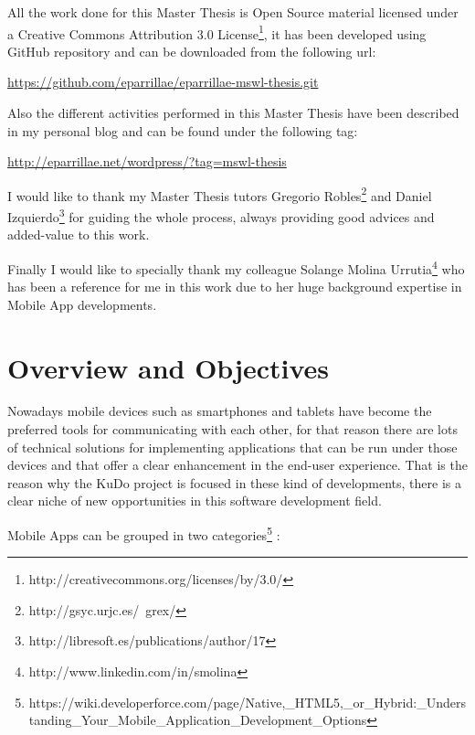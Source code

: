 \documentclass[a4paper,12pt]{book}
\begin{document}
All the work done for this Master Thesis is Open Source material licensed under a Creative Commons Attribution 3.0 License\footnote{http://creativecommons.org/licenses/by/3.0/}, it has been developed using GitHub repository and can be downloaded from the following url:

\url{
https://github.com/eparrillae/eparrillae-mswl-thesis.git}


Also the different activities performed in this Master Thesis have been described in my personal blog and can be found under the following tag:

\url{
http://eparrillae.net/wordpress/?tag=mswl-thesis}


I would like to thank my Master Thesis tutors Gregorio Robles\footnote{http://gsyc.urjc.es/~grex/}  and Daniel Izquierdo\footnote{http://libresoft.es/publications/author/17} for guiding the whole process, always providing good advices and added-value to this work.


Finally I would like to specially thank my colleague Solange Molina Urrutia\footnote{http://www.linkedin.com/in/smolina} who has been a reference for me in this work due to her huge background expertise in Mobile App developments.  


\chapter{Overview and Objectives}
\label{chap:overview}

Nowadays mobile devices such as smartphones and tablets have become the preferred tools for communicating with each other, for that reason there are lots of technical solutions for implementing applications that can be run under those devices and that offer a clear enhancement in the end-user experience. That is the reason why the KuDo project is focused in these kind of developments, there is a clear niche of new opportunities in this software development field.

Mobile Apps can be grouped in two categories\footnote{https://wiki.developerforce.com/page/Native,\_HTML5,\_or\_Hybrid:\_Understanding\_Your\_Mobile\_Application\_Development\_Options} :
\end{document}
